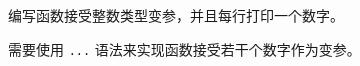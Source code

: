 \begin{Exercise}[title={变参},difficulty=1]
\label{ex:varargs}
\Question\label{ex:varargs q1}
编写函数接受整数类型变参，并且每行打印一个数字。
\end{Exercise}

\begin{Answer}
\Question
需要使用 \lstinline{...} 语法来实现函数接受若干个数字作为变参。



\end{Answer}
